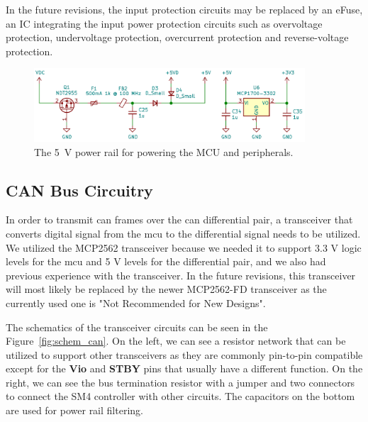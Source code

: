 In the future revisions, the input protection circuits may be replaced by an eFuse\cite{greatscott_best_2021,texas_instruments_efuse_2021}, an IC integrating the input power protection circuits such as overvoltage protection, undervoltage protection, overcurrent protection and reverse-voltage protection.

\begin{figure}[H]
    \centering
    \includegraphics[width=0.9\textwidth]{obrazky/schem_power}
    \caption{The 5~V power rail for powering the MCU and peripherals.}
    \label{fig:power}
\end{figure}

\subsection{CAN Bus Circuitry}
\label{subsec:can_circuitry}
In order to transmit \acs{can} frames over the \acs{can} differential pair, a transceiver that converts digital signal from the \acs{mcu} to the differential signal needs to be utilized.
We utilized the MCP2562 transceiver because we needed it to support 3.3 V logic levels for the \acs{mcu} and 5 V levels for the differential pair, and we also had previous experience with the transceiver.
In the future revisions, this transceiver will most likely be replaced by the newer MCP2562-FD transceiver as the currently used one is "Not Recommended for New Designs"\cite{microchip_mcp2562_nodate}.

The schematics of the transceiver circuits can be seen in the Figure~\ref{fig:schem_can}.
On the left, we can see a resistor network that can be utilized to support other transceivers as they are commonly pin-to-pin compatible except for the \textbf{Vio} and \textbf{STBY} pins that usually have a different function.
On the right, we can see the bus termination resistor with a jumper and two connectors to connect the SM4 controller with other circuits.
The capacitors on the bottom are used for power rail filtering.

